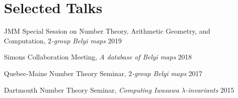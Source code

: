 \newcommand{\playsymbol}{$\blacktriangleright$}

\section{\sc Selected Talks}
\begin{etaremune}
\item
  JMM Special Session on Number Theory, Arithmetic Geometry, and Computation,
  \newline
  {\it $2$-group Belyi maps}
  \hfill{}
  2019
\item
  Simons Collaboration Meeting,
  {\it A database of Belyi maps}
  \hfill{}
  2018
\item
  Quebec-Maine Number Theory Seminar,
  {\it $2$-group Belyi maps}
  \hfill{}
  2017
\item
  Dartmouth Number Theory Seminar,
  {\it Computing Iwasawa $\lambda$-invariants}
  \hfill{}
  2015
\end{etaremune}

